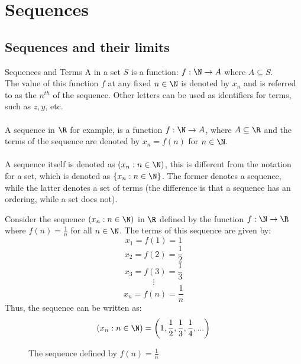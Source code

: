 \documentclass[openany]{book}
\begin{document}
\section{Sequences}
\subsection{Sequences and their limits}
\begin{mydefinition}{Sequences and Terms}
    A  in a set $S$ is a function: $f: \N \rightarrow A$ where $A \subseteq S$. \\ 
    The value of this function $f$ at any fixed $n \in \N$ is denoted by $x_n$ and is referred to as the  $n^{th}$  of the sequence. Other letters can be used as identifiers for terms, such as $z, y$, etc. \\\\
    A sequence in $\R$ for example, is a function $f: \N \rightarrow A$, where $A \subseteq \R$ and the terms of the sequence are denoted by $x_n = f(n)$ for $n \in \N$. \\\\
    A sequence itself is denoted as $(x_n : n \in \N)$, this is different from the notation for a set, which is denoted as $\{x_n : n \in \N\}$. The former denotes a sequence, while the latter denotes a set of terms (the difference is that a sequence has an ordering, while a set does not). 
\end{mydefinition}
\begin{example}
    Consider the sequence $(x_n : n \in \N)$ in $\R$ defined by the function $f: \N \rightarrow \R$ where $f(n) = \frac{1}{n}$ for all $n \in \N$. The terms of this sequence are given by:
    $$x_1 = f(1) = 1$$
    $$x_2 = f(2) = \frac{1}{2}$$
    $$x_3 = f(3) = \frac{1}{3}$$
    $$\vdots$$
    $$x_n = f(n) = \frac{1}{n}$$
    Thus, the sequence can be written as:
    $$(x_n : n \in \N) = \left(1, \frac{1}{2}, \frac{1}{3}, \frac{1}{4}, ...\right)$$
    \begin{figure}[H]
        \centering
        \caption{The sequence defined by $f(n) = \frac{1}{n}$}
    \end{figure}
\end{example}
\end{document}
